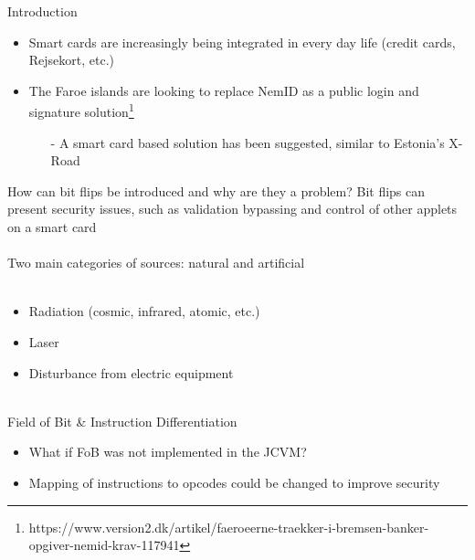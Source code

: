 


\begin{frame}[fragile]{Introduction}
\begin{center}
	\begin{itemize}
	\item Smart cards are increasingly being integrated in every day life (credit cards, Rejsekort, etc.)
	\item The Faroe islands are looking to replace NemID as a public login and signature solution\footnote{https://www.version2.dk/artikel/faeroeerne-traekker-i-bremsen-banker-opgiver-nemid-krav-117941}
		\begin{itemize}
		\item[-] A smart card based solution has been suggested, similar to Estonia's X-Road 
		\end{itemize}
	\end{itemize}
\end{center}
\end{frame}

\begin{frame}[fragile]{\large How can bit flips be introduced and why are they a problem?}
Bit flips can present security issues, such as validation bypassing and control of other applets on a smart card\\~\\
Two main categories of sources: natural and artificial\\~\\
	\begin{itemize}
	\item Radiation (cosmic, infrared, atomic, etc.)
	\item Laser
    \item Disturbance from electric equipment\\~\\
	\end{itemize}
\end{frame}

\begin{frame}[fragile]{Field of Bit \& Instruction Differentiation}
\begin{itemize}
\item What if FoB was not implemented in the JCVM?
\item Mapping of instructions to opcodes could be changed to improve security
\end{itemize}
\end{frame}

